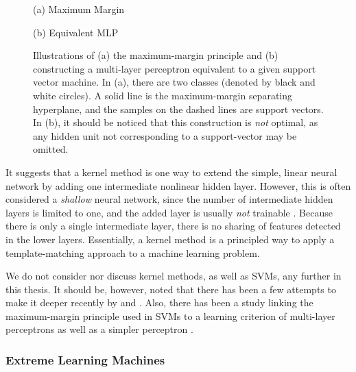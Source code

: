 \documentclass[dissertation,nocontribution,draft*]{aaltoseries}
\begin{document}
\begin{figure}[t]
    \vspace{2mm}
    \begin{minipage}{0.48\textwidth}
        \centering
        \small
        (a) Maximum Margin
    \end{minipage}
    \begin{minipage}{0.48\textwidth}
        \centering
        \small
        (b) Equivalent MLP
    \end{minipage}
    \caption{Illustrations of (a) the maximum-margin
    principle and (b) constructing a multi-layer
    perceptron equivalent to a given support vector machine.
    In (a), there are two classes (denoted by black and
    white circles). A solid line is the maximum-margin
    separating hyperplane, and the samples on the dashed
    lines are support vectors. In (b), it should be noticed
    that this construction is \textit{not} optimal, as any
    hidden unit not corresponding to a support-vector may be
    omitted.}
    \label{fig:svm}
\end{figure}


It suggests that a kernel method is one way to extend the
simple, linear neural network by adding one intermediate
nonlinear hidden layer. However, this is often considered a
\textit{shallow} neural network, since the number of
intermediate hidden layers is limited to one, and the added
layer is usually \textit{not} trainable \citep{Bengio2007a}.
Because there is only a single intermediate layer, there is
no sharing of features detected in the lower layers.
Essentially, a kernel method is a principled way to apply a
template-matching approach to a machine learning problem.

We do not consider nor discuss kernel methods, as
well as SVMs, any further in this thesis.  It should be,
however, noted that there has been a few attempts to make it
deeper recently by \citet{Cho2009} and \citet{Damianou2012}.
Also, there has been a study linking the maximum-margin
principle used in SVMs to a learning criterion of
multi-layer perceptrons as well as a simpler perceptron
\citep[see, e.g.,][]{Collobert2004}.

\subsubsection{Extreme Learning Machines}
\label{sec:elm}
\end{document}

